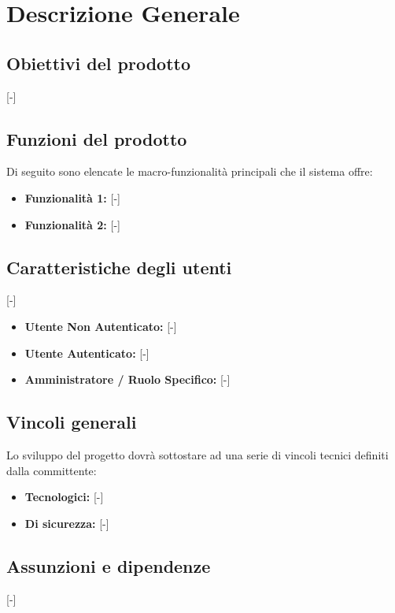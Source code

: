 \section{Descrizione Generale}

\subsection{Obiettivi del prodotto}
[-]

\subsection{Funzioni del prodotto}
Di seguito sono elencate le macro-funzionalità principali che il sistema offre:
\begin{itemize}
	\item \textbf{Funzionalità 1:} [-]
	\item \textbf{Funzionalità 2:} [-]
\end{itemize}

\subsection{Caratteristiche degli utenti}
[-]
\begin{itemize}
	\item \textbf{Utente Non Autenticato:} [-]
	\item \textbf{Utente Autenticato:} [-]
	\item \textbf{Amministratore / Ruolo Specifico:} [-]
\end{itemize}

\subsection{Vincoli generali}
Lo sviluppo del progetto dovrà sottostare ad una serie di vincoli tecnici definiti dalla committente:
\begin{itemize}
	\item \textbf{Tecnologici:} [-]
	\item \textbf{Di sicurezza:} [-]
\end{itemize}

\subsection{Assunzioni e dipendenze}
[-]
